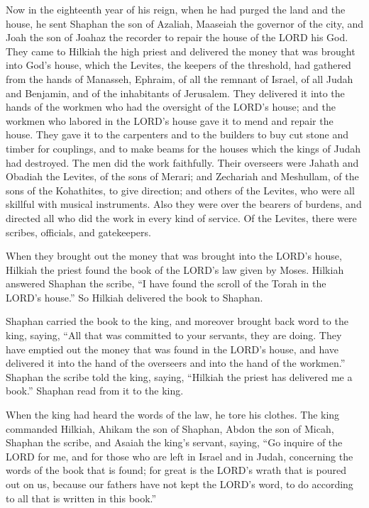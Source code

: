 \myverse{}Now in the eighteenth year of his reign, when he had purged the
land and the house, he sent Shaphan the son of Azaliah, Maaseiah the governor of the city, and Joah the
son of Joahaz the recorder to repair the house of the LORD his God.
\myverse{}They came to Hilkiah the high priest and delivered the money that was brought
into God’s house, which the Levites, the keepers of the threshold, had gathered from the hands of Manasseh,
Ephraim, of all the remnant of Israel, of all Judah and Benjamin, and of the inhabitants of Jerusalem.
\myverse{}They delivered it into the hands of the workmen who had the oversight of
the LORD’s house; and the workmen who labored in the LORD’s house gave it to mend and repair the house.
\myverse{}They gave it to the carpenters and to the builders to buy cut stone and timber
for couplings, and to make beams for the houses which the kings of Judah had destroyed.
\myverse{}The men did the work faithfully. Their overseers were Jahath and Obadiah
the Levites, of the sons of Merari; and Zechariah and Meshullam, of the sons of the Kohathites, to give
direction; and others of the Levites, who were all skillful with musical instruments.
\myverse{}Also they were over the bearers of burdens, and directed all who did the
work in every kind of service. Of the Levites, there were scribes, officials, and gatekeepers.

\myverse{}When they brought out the money that was brought into the LORD’s
house, Hilkiah the priest found the book of the LORD’s law given by Moses.
\myverse{}Hilkiah answered Shaphan the scribe, “I have found the scroll of the Torah
in the LORD’s house.” So Hilkiah delivered the book to Shaphan.

\myverse{}Shaphan carried the book to the king, and moreover brought back
word to the king, saying, “All that was committed to your servants, they are doing.
\myverse{}They have emptied out the money that was found in the LORD’s house, and have
delivered it into the hand of the overseers and into the hand of the workmen.”
\myverse{}Shaphan the scribe told the king, saying, “Hilkiah the priest has delivered
me a book.” Shaphan read from it to the king.

\myverse{}When the king had heard the words of the law, he tore his clothes.
\myverse{}The king commanded Hilkiah, Ahikam the son of Shaphan, Abdon the son of Micah,
Shaphan the scribe, and Asaiah the king’s servant, saying,
\myverse{}“Go inquire of the LORD for me, and for those who are left in Israel and
in Judah, concerning the words of the book that is found; for great is the LORD’s wrath that is poured
out on us, because our fathers have not kept the LORD’s word, to do according to all that is written in
this book.”

